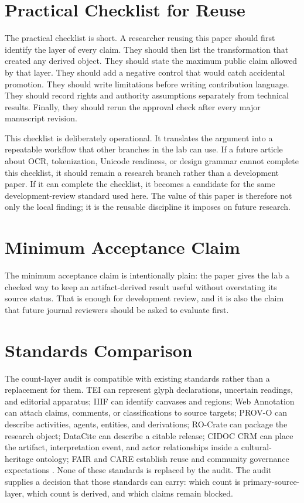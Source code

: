 \documentclass[sigconf,nonacm]{acmart}
\begin{document}
\section{Practical Checklist for Reuse}
The practical checklist is short. A researcher reusing this paper should first
identify the layer of every claim. They should then list the transformation that
created any derived object. They should state the maximum public claim allowed
by that layer. They should add a negative control that would catch accidental
promotion. They should write limitations before writing contribution language.
They should record rights and authority assumptions separately from technical
results. Finally, they should rerun the approval check after every major
manuscript revision.

This checklist is deliberately operational. It translates the argument into a
repeatable workflow that other branches in the lab can use. If a future article
about OCR, tokenization, Unicode readiness, or design grammar cannot complete
this checklist, it should remain a research branch rather than a development
paper. If it can complete the checklist, it becomes a candidate for the same
development-review standard used here. The value of this paper is therefore not
only the local finding; it is the reusable discipline it imposes on future
research.

\section{Minimum Acceptance Claim}
The minimum acceptance claim is intentionally plain: the paper gives the lab a
checked way to keep an artifact-derived result useful without overstating its
source status. That is enough for development review, and it is also the claim
that future journal reviewers should be asked to evaluate first.



\section{Standards Comparison}
The count-layer audit is compatible with existing standards rather than a
replacement for them. TEI can represent glyph declarations, uncertain readings,
and editorial apparatus; IIIF can identify canvases and regions; Web Annotation
can attach claims, comments, or classifications to source targets; PROV-O can
describe activities, agents, entities, and derivations; RO-Crate can package the
research object; DataCite can describe a citable release; CIDOC CRM can place
the artifact, interpretation event, and actor relationships inside a
cultural-heritage ontology; FAIR and CARE establish reuse and community
governance expectations \cite{azuonye1992,omniglotNwagu,unicodeAfricanScripts2023,scriptSourceNwagu,sirisNwaguProposal,teiP5Glyphs,iiifPresentation3,w3cAnnotationModel,w3cAnnotationVocab,w3cProvO,rocrate12,cidocCrm,datacite45,wilkinson2016fair,carroll2020care,wadden2020scifact,gao2023alce,karpathyAutoresearch,acmSubmissions,arxivSubmitTex}. None of these standards is
replaced by the audit. The audit supplies a decision that those standards can
carry: which count is primary-source-layer, which count is derived, and which
claims remain blocked.
\end{document}

